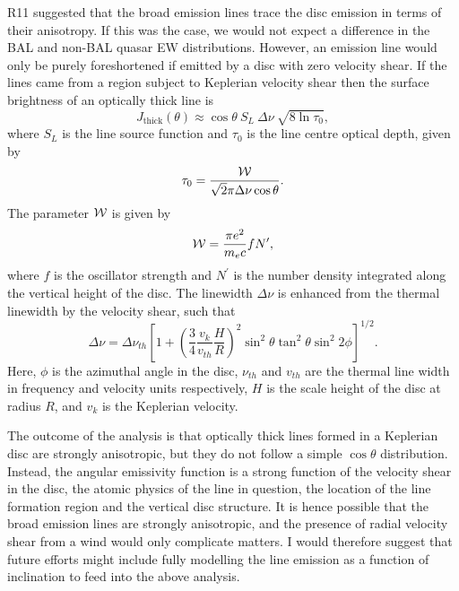 R11 suggested that the broad emission lines trace the disc
emission in terms of their anisotropy. 
If this was the case, we would not expect a difference in the BAL and non-BAL
quasar EW distributions. However, an emission line would only be purely 
foreshortened if emitted by a disc with zero velocity shear. 
If the lines came from a region subject to
Keplerian velocity shear then the surface brightness of an optically thick 
line is \citep{hornemarsh1986}
\begin{equation}
J_{\mathrm{thick}}(\theta) \approx \cos \theta~S_L~\Delta \nu~\sqrt{8 \ln \tau_0},
\end{equation}
where $S_L$ is the line source function and
$\tau_0$ is the line centre optical depth, given by
\begin{equation}
\tau_0 = \frac{{\cal W}}{\sqrt{2}\pi \Delta \nu \cos \theta}.
\end{equation}
The parameter ${{\cal W}}$ is given by
\begin{equation}
{{\cal W}} = \frac{\pi e^2}{m_e c}f N^\prime,
\end{equation}
where $f$ is the oscillator strength and $N^\prime$ is the number
density integrated along the vertical height of the disc. The linewidth
$\Delta \nu$ is enhanced from the thermal linewidth by the velocity shear, such
that
\begin{equation}
\Delta \nu = \Delta \nu_{th} \left[1 + 
\left(\frac{3}{4}\frac{v_{k}}{v_{th}}\frac{H}{R}\right)^2
\sin^2 \theta \tan^2 \theta \sin^2 2 \phi
\right]^{1/2}.
\end{equation}
Here, $\phi$ is the azimuthal angle in the disc, $\nu_{th}$ and $v_{th}$ are the 
thermal line width in frequency and velocity units respectively, 
$H$ is the scale height of the disc at radius $R$, and $v_k$ is the
Keplerian velocity.

The outcome of the \cite{hornemarsh1986} analysis is that optically thick lines 
formed in a Keplerian disc are strongly anisotropic, but they do not follow a simple 
$\cos \theta$ distribution. Instead, the angular emissivity function is
a strong function of the velocity shear in the disc, the atomic physics of
the line in question, the location of the line formation region 
and the vertical disc structure. It is hence possible
that the broad emission lines are strongly anisotropic, and the presence of radial
velocity shear from a wind would only complicate matters. 
I would therefore suggest that future efforts might include fully modelling 
the line emission as a function of inclination to feed into the above analysis.

